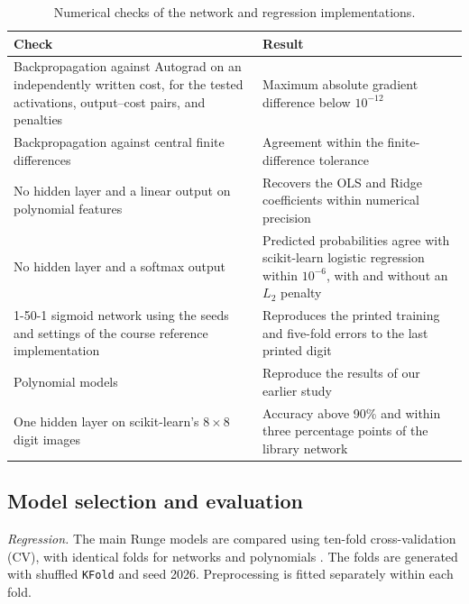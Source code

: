 \documentclass[aps,prb,reprint,superscriptaddress,nofootinbib,longbibliography,floatfix]{revtex4-2}
\begin{document}
\begin{table}[tb]
\caption{Numerical checks of the network and regression implementations.}
\label{tab:verification}
\renewcommand{\arraystretch}{1.15}
\begin{ruledtabular}
\begin{tabular}{p{}p{}}
Check & Result \\ \hline
Backpropagation against Autograd on an independently written cost,
for the tested activations, output--cost pairs, and penalties
& Maximum absolute gradient difference below $10^{-12}$ \\

Backpropagation against central finite differences
& Agreement within the finite-difference tolerance \\

No hidden layer and a linear output on polynomial features
& Recovers the OLS and Ridge coefficients within numerical precision \\

No hidden layer and a softmax output
& Predicted probabilities agree with scikit-learn logistic regression
within $10^{-6}$, with and without an $L_2$ penalty \\

1-50-1 sigmoid network using the seeds and settings of the course
reference implementation \cite{HjorthJensen2026week44}
& Reproduces the printed training and five-fold errors
to the last printed digit \\

Polynomial models
& Reproduce the results of our earlier study \\

One hidden layer on scikit-learn's $8\times8$ digit images
& Accuracy above 90\% and within three percentage points
of the library network \\
\end{tabular}
\end{ruledtabular}
\end{table}

\subsection{Model selection and evaluation}\label{sec:selection}
\emph{Regression.}
The main Runge models are compared using ten-fold cross-validation (CV), with identical folds for networks and polynomials \cite[Sec.~2.12]{HjorthJensen2026}. The folds are generated with shuffled \texttt{KFold} and seed 2026. Preprocessing is fitted separately within each fold.
\end{document}
